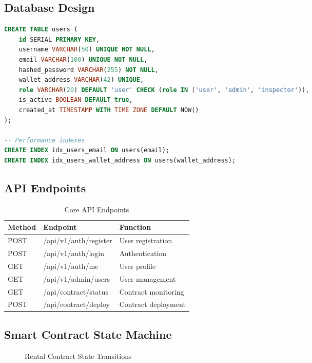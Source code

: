 \documentclass[11pt,a4paper]{article}
\begin{document}
\subsection{Database Design}
\begin{lstlisting}[language=SQL, caption=Core User Table]
CREATE TABLE users (
    id SERIAL PRIMARY KEY,
    username VARCHAR(50) UNIQUE NOT NULL,
    email VARCHAR(100) UNIQUE NOT NULL,
    hashed_password VARCHAR(255) NOT NULL,
    wallet_address VARCHAR(42) UNIQUE,
    role VARCHAR(20) DEFAULT 'user' CHECK (role IN ('user', 'admin', 'inspector')),
    is_active BOOLEAN DEFAULT true,
    created_at TIMESTAMP WITH TIME ZONE DEFAULT NOW()
);

-- Performance indexes
CREATE INDEX idx_users_email ON users(email);
CREATE INDEX idx_users_wallet_address ON users(wallet_address);
\end{lstlisting}

\subsection{API Endpoints}
\begin{table}[H]
\centering
\begin{tabular}{|l|l|p{5cm}|}
\hline
\textbf{Method} & \textbf{Endpoint} & \textbf{Function} \\
\hline
POST & /api/v1/auth/register & User registration \\
POST & /api/v1/auth/login & Authentication \\
GET & /api/v1/auth/me & User profile \\
GET & /api/v1/admin/users & User management \\
GET & /api/contract/status & Contract monitoring \\
POST & /api/contract/deploy & Contract deployment \\
\hline
\end{tabular}
\caption{Core API Endpoints}
\end{table}

\subsection{Smart Contract State Machine}
\begin{figure}[H]
\centering
{}
\caption{Rental Contract State Transitions}
\end{figure}
\end{document}
